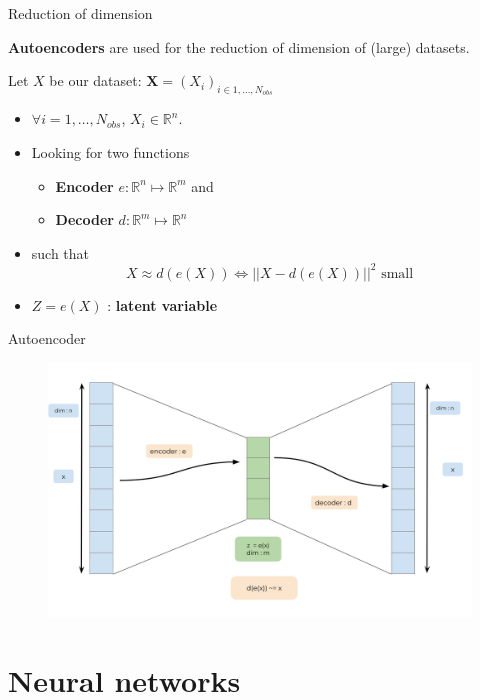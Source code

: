 \documentclass[compress,10pt]{beamer}
\begin{document}
\begin{frame}{Reduction of dimension}

\textbf{Autoencoders} are used for the reduction of dimension of
(large) datasets.

Let \(X\) be our dataset:
\(\mathbf{X}=(X_i)_{i \in 1, \dots,N_{obs}}\)

\begin{itemize}
\item
  \(\forall i =1,\dots,N_{obs}\), \(X_i \in \mathbb{R}^n\).
\item
  Looking for two functions
  \begin{itemize}
\item
  \textbf{Encoder} \(e :\mathbb{R}^n \mapsto \mathbb{R}^m\) and
\item
  \textbf{Decoder} \(d :\mathbb{R}^m \mapsto \mathbb{R}^n\)
\end{itemize}
  \item
  such that
  \[X \approx d(e(X)) \Leftrightarrow ||X -   d(e(X)) ||^2 \mbox{ small } \]
\item
  \(Z = e(X)\) : \textbf{latent variable}
\end{itemize}
\end{frame}





\begin{frame}{Autoencoder}
\begin{figure}

{\centering \includegraphics[width=0.9\linewidth]{images/Autoencoder} 

}
\end{figure}
\end{frame}

\section{Neural networks}
\end{document}

